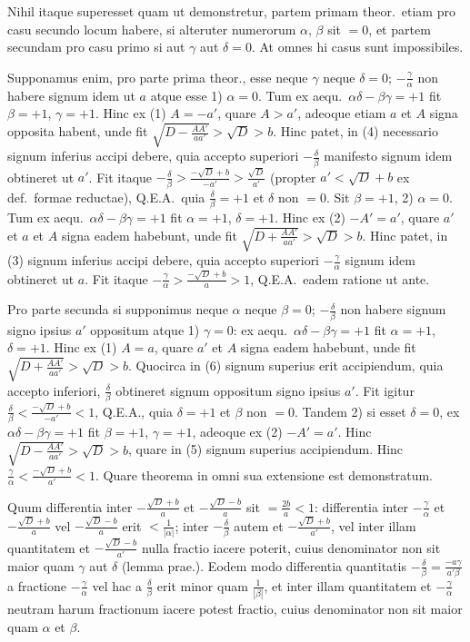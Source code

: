 \documentclass[12pt,a4paper]{article}
\theoremstyle{plain}
\begin{document}
Nihil itaque superesset quam ut demonstretur, partem primam theor.~etiam pro casu secundo locum habere, si alteruter numerorum $\alpha$, $\beta$ sit $= 0$, et partem secundam pro casu primo si aut $\gamma$ aut $\delta = 0$. At omnes hi casus sunt impossibiles.

Supponamus enim, pro parte prima theor., esse neque $\gamma$ neque $\delta = 0$; $-\frac{\gamma}{\alpha}$ non habere signum idem ut $a$ atque esse 1) $\alpha = 0$. Tum ex aequ.~$\alpha\delta - \beta\gamma = +1$ fit $\beta = +1$, $\gamma = +1$. Hinc ex (1) $A = -a'$, quare $A > a'$, adeoque etiam $a$ et $A$ signa opposita habent, unde fit $\sqrt{D - \frac{AA'}{aa'}} > \sqrt{D} > b$. Hinc patet, in (4) necessario signum inferius accipi debere, quia accepto superiori $-\frac{\delta}{\beta}$ manifesto signum idem obtineret ut $a'$. Fit itaque $-\frac{\delta}{\beta} > \frac{-\sqrt{D} + b}{-a'} > \frac{\sqrt{D}}{a'}$ (propter $a' < \sqrt{D} + b$ ex def.~formae reductae), Q.E.A.~quia $\frac{\delta}{\beta} = +1$ et $\delta$ non $= 0$. Sit $\beta = +1$, 2) $\alpha = 0$. Tum ex aequ.~$\alpha\delta - \beta\gamma = +1$ fit $\alpha = +1$, $\delta = +1$. Hinc ex (2) $-A' = a'$, quare $a'$ et $a$ et $A$ signa eadem habebunt, unde fit $\sqrt{D + \frac{AA'}{aa'}} > \sqrt{D} > b$. Hinc patet, in (3) signum inferius accipi debere, quia accepto superiori $-\frac{\gamma}{\alpha}$ signum idem obtineret ut $a$. Fit itaque $-\frac{\gamma}{\alpha} > \frac{-\sqrt{D} + b}{a} > 1$, Q.E.A.~eadem ratione ut ante.

Pro parte secunda si supponimus neque $\alpha$ neque $\beta = 0$; $-\frac{\delta}{\beta}$ non habere signum signo ipsius $a'$ oppositum atque 1) $\gamma = 0$: ex aequ.~$\alpha\delta - \beta\gamma = +1$ fit $\alpha = +1$, $\delta = +1$. Hinc ex (1) $A = a$, quare $a'$ et $A$ signa eadem habebunt, unde fit $\sqrt{D + \frac{AA'}{aa'}} > \sqrt{D} > b$. Quocirca in (6) signum superius erit accipiendum, quia accepto inferiori, $\frac{\delta}{\beta}$ obtineret signum oppositum signo ipsius $a'$. Fit igitur $\frac{\delta}{\beta} < \frac{-\sqrt{D} + b}{-a'} < 1$, Q.E.A., quia $\delta = +1$ et $\beta$ non $= 0$. Tandem 2) si esset $\delta = 0$, ex $\alpha\delta - \beta\gamma = +1$ fit $\beta = +1$, $\gamma = +1$, adeoque ex (2) $-A' = a'$. Hinc $\sqrt{D - \frac{AA'}{aa'}} > \sqrt{D} > b$, quare in (5) signum superius accipiendum. Hinc $\frac{\gamma}{\alpha} < \frac{-\sqrt{D} + b}{a'} < 1$. Quare theorema in omni sua extensione est demonstratum.

Quum differentia inter $-\frac{\sqrt{D} + b}{a}$ et $-\frac{\sqrt{D} - b}{a}$ sit $= \frac{2b}{a} < 1$: differentia inter $-\frac{\gamma}{\alpha}$ et $-\frac{\sqrt{D} + b}{a}$ vel $-\frac{\sqrt{D} - b}{a}$ erit $< \frac{1}{|\alpha|}$; inter $-\frac{\delta}{\beta}$ autem et $-\frac{\sqrt{D} + b}{a'}$, vel inter illam quantitatem et $-\frac{\sqrt{D} - b}{a'}$ nulla fractio iacere poterit, cuius denominator non sit maior quam $\gamma$ aut $\delta$ (lemma prae.). Eodem modo differentia quantitatis $-\frac{\delta}{\beta} = \frac{-a\gamma}{a'\beta}$ a fractione $-\frac{\gamma}{\alpha}$ vel hac a $\frac{\delta}{\beta}$ erit minor quam $\frac{1}{|\beta|}$, et inter illam quantitatem et $-\frac{\gamma}{\alpha}$ neutram harum fractionum iacere potest fractio, cuius denominator non sit maior quam $\alpha$ et $\beta$.
\end{document}
